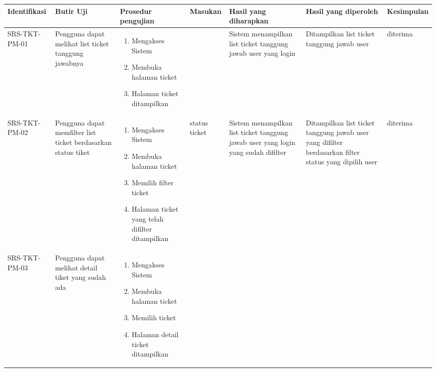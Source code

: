 \documentclass[12pt]{article}
\begin{document}
\begin{enumerate}[label=\textbf{5.\arabic*.}]
\begin{enumerate}[label=\textbf{5.2.\arabic*.}]
\begin{landscape}
\begin{longtable}{ |l|p{}|p{}|p{}|p{}|p{}|l| }
                \hline
                \textbf{Identifikasi} & \textbf{Butir Uji} & \textbf{Prosedur pengujian}  & \textbf{Masukan}  & \textbf{Hasil yang diharapkan}  & \textbf{Hasil yang diperoleh}  & \textbf{Kesimpulan}\\
                \hline
                \endhead
              
 
                
                \hline
                SRS-TKT-PM-01 & Pengguna dapat melihat list ticket tanggung jawabnya & 
                \begin{enumerate}[label=\arabic*.] 
                    \item Mengakses Sistem
                    \item Membuka halaman ticket
                    \item Halaman ticket ditampilkan
                \end{enumerate} 
                &  & Sistem menampilkan list ticket tanggung jawab user yang login & Ditampilkan list ticket tanggung jawab user & diterima \\
                \hline
                SRS-TKT-PM-02 & Pengguna dapat memfilter list ticket berdasarkan status tiket & 
                \begin{enumerate}[label=\arabic*.] 
                    \item Mengakses Sistem
                    \item Membuka halaman ticket
                    \item Memilih filter ticket
                    \item Halaman ticket yang telah difilter ditampilkan
                \end{enumerate} 
                & status ticket & Sistem menampilkan list ticket tanggung jawab user yang login yang sudah difilter & Ditampilkan list ticket tanggung jawab user yang difilter berdasarkan filter status yang dipilih user& diterima \\
                \hline
                SRS-TKT-PM-03 & Pengguna dapat melihat detail tiket yang sudah ada &  
                \begin{enumerate}[label=\arabic*.] 
                    \item Mengakses Sistem
                    \item Membuka halaman ticket
                    \item Memilih ticket
                    \item Halaman detail ticket ditampilkan

\end{enumerate}
\end{longtable}
\end{landscape}
\end{enumerate}
\end{enumerate}
\end{document}
